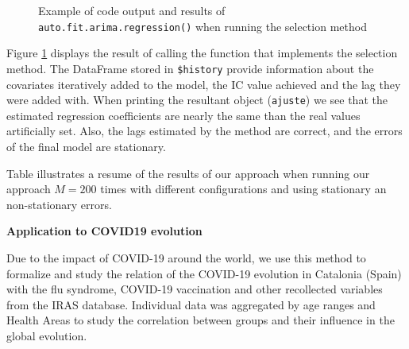 \documentclass[twoside]{article}
\begin{document}
\begin{figure}
    \caption{Example of code output and results of \texttt{auto.fit.arima.regression()} when running the selection method}
    \label{simulation.example}
    \vspace{0.3em}
\end{figure}


Figure \ref{simulation.example} displays the result of calling the function that implements the selection method. The DataFrame stored in \texttt{\$history} provide information about the covariates iteratively added to the model, the IC value achieved and the lag they were added with. When printing the resultant object (\texttt{ajuste}) we see that the estimated regression coefficients are nearly the same than the real values artificially set. Also, the lags estimated by the method are correct, and the errors of the final model are stationary.

Table illustrates a resume of the results of our approach when running our approach $M=200$ times with different configurations and using stationary an non-stationary errors.






\begin{center}
\textbf{Application to COVID19 evolution}
\end{center}



Due to the impact of COVID-19 around the world, we use this method to formalize and study the relation of the COVID-19 evolution in Catalonia (Spain) with the flu syndrome, COVID-19 vaccination and other recollected variables from the IRAS database. Individual data was aggregated by age ranges and Health Areas to study the correlation between groups and their influence in the global evolution. 
\end{document}
